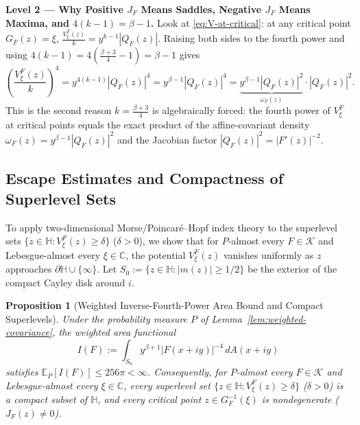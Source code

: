 \documentclass[12pt]{article}
\def\C{\mathbb{C}}
\def\H{\mathbb{H}}
\def\K{\mathcal{K}}
\def\E{\mathbb{E}}
\newtheorem{prop}[thm]{Proposition}
\theoremstyle{definition}
\numberwithin{equation}{section}
\begin{document}
\begin{leveltwo}
\noindent\textbf{\textcolor{l2border}{Level 2 --- Why Positive $J_F$ Means Saddles, Negative $J_F$ Means Maxima, and $4(k-1) = \beta-1$.}}
Look at \eqref{eq:V-at-critical}: at any critical point $G_F(z) = \xi$, $\frac{V_\xi^F(z)}{k} = y^{k-1}|Q_F(z)|$. Raising both sides to the fourth power and using $4(k-1) = 4(\frac{\beta+3}{4} - 1) = \beta - 1$ gives
\[
  \left(\frac{V_\xi^F(z)}{k}\right)^4 = y^{4(k-1)} |Q_F(z)|^4 = y^{\beta - 1} |Q_F(z)|^4 = \underbrace{y^{\beta-1}|Q_F(z)|^2}_{\omega_F(z)} \cdot |Q_F(z)|^2.
\]
This is the second reason $k = \frac{\beta+3}{4}$ is algebraically forced: the fourth power of $V_\xi^F$ at critical points equals the exact product of the affine-covariant density $\omega_F(z) = y^{\beta-1}|Q_F(z)|^2$ and the Jacobian factor $|Q_F(z)|^2 = |F'(z)|^{-2}$.
\end{leveltwo}

\subsection{Escape Estimates and Compactness of Superlevel Sets}

To apply two-dimensional Morse/Poincar\'e--Hopf index theory to the superlevel sets $\{z \in \H : V_\xi^F(z) \ge \delta\}$ ($\delta > 0$), we show that for $P$-almost every $F \in \K$ and Lebesgue-almost every $\xi \in \C$, the potential $V_\xi^F(z)$ vanishes uniformly as $z$ approaches $\partial \H \cup \{\infty\}$. Let $S_0 := \{z \in \H : |m(z)| \ge 1/2\}$ be the exterior of the compact Cayley disk around $i$.

\begin{prop}[Weighted Inverse-Fourth-Power Area Bound and Compact Superlevels]\label{prop:escape}
Under the probability measure $P$ of Lemma~\ref{lem:weighted-covariance}, the weighted area functional
\begin{equation}\label{eq:IF-def}
  I(F) := \int_{S_0} y^{\beta + 1} |F(x + iy)|^{-4} \, dA(x + iy)
\end{equation}
satisfies $\E_P[I(F)] \le 256\pi < \infty$. Consequently, for $P$-almost every $F \in \K$ and Lebesgue-almost every $\xi \in \C$, every superlevel set $\{z \in \H : V_\xi^F(z) \ge \delta\}$ ($\delta > 0$) is a compact subset of $\H$, and every critical point $z \in G_F^{-1}(\xi)$ is nondegenerate ($J_F(z) \ne 0$).
\end{prop}
\end{document}

